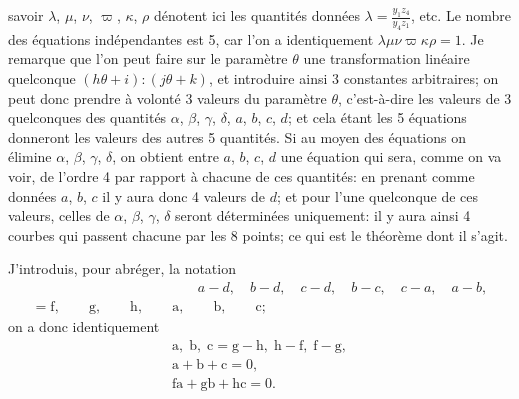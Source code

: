 \documentclass[11pt,a4paper]{book}
\begin{document}
savoir $\lambda$, $\mu$, $\nu$, $\varpi$, $\kappa$, $\rho$ d\'enotent ici les quantit\'es donn\'ees $\lambda=\frac{y_1z_4}{y_4z_1}$, etc. Le nombre des \'equations ind\'ependantes est 5, car l'on a identiquement $\lambda\mu\nu\varpi\kappa\rho=1$. Je remarque que l'on peut faire sur le param\`etre $\theta$ une transformation lin\'eaire quelconque $(h\theta+i):(j\theta+k)$, et introduire ainsi 3 constantes arbitraires; on peut donc prendre \`a volont\'e 3 valeurs du param\`etre $\theta$, c'est-\`a-dire les valeurs de 3 quelconques des quantit\'es $\alpha$, $\beta$, $\gamma$, $\delta$, $a$, $b$, $c$, $d$; et cela \'etant les 5 \'equations donneront les valeurs des autres 5 quantit\'es. Si au moyen des \'equations on \'elimine $\alpha$, $\beta$, $\gamma$, $\delta$, on obtient entre $a$, $b$, $c$, $d$ une \'equation qui sera, comme on va voir, de l'ordre 4 par rapport \`a chacune de ces quantit\'es: en prenant comme donn\'ees $a$, $b$, $c$ il y aura donc 4 valeurs de $d$; et pour l'une quelconque de ces valeurs, celles de $\alpha$, $\beta$, $\gamma$, $\delta$ seront d\'etermin\'ees uniquement: il y aura ainsi 4 courbes qui passent chacune par les 8 points; ce qui est le th\'eor\`eme dont il s'agit.

J'introduis, pour abr\'eger, la notation
\begin{gather*}
\phantom{=\mathrm{f},\quad\mathrm{g},\quad\mathrm{h},\quad\mathrm{a},\quad\mathrm{b},\quad\mathrm{c};}a-d,\quad b-d,\quad c-d,\quad b-c,\quad c-a,\quad a-b,\\
=\mathrm{f},\qquad\mathrm{g},\qquad\mathrm{h},\qquad\mathrm{a},\qquad\mathrm{b},\qquad\mathrm{c};
\end{gather*}
on a donc identiquement
\begin{gather*}
\mathrm{a},\;\mathrm{b},\;\mathrm{c}=\mathrm{g}-\mathrm{h},\;\mathrm{h}-\mathrm{f},\;\mathrm{f}-\mathrm{g},\\
\mathrm{a}+\mathrm{b}+\mathrm{c}=0,\\
\mathrm{fa}+\mathrm{gb}+\mathrm{hc}=0.
\end{gather*}
\end{document}
